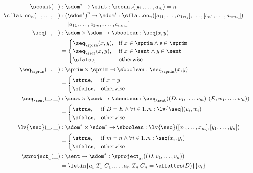 \begin{align*}
\scount(\_) &: \sdom^{*} \to \sint : \scount([a_1, \dots, a_n]) = n \\
\sflatten_n(\_, \dots, \_) &: \left(\sdom^{*}\right)^n \to \sdom^{*} : \sflatten_n([a_{11}, \dots, a_{1m_1}], \dots, [a_{n1}, \dots, a_{nm_n}]) \\
&= [a_{11}, \dots, a_{1m_1}, \dots, a_{nm_n}] \\
\seq(\_, \_) &: \sdom \times \sdom \to \sboolean : \seq(x, y) \\
&= \begin{cases}
\seq_\sprim(x, y), & \text{if } x \in \sprim \land y \in \sprim \\
\seq_\sent(x, y), & \text{if } x \in \sent \land y \in \sent \\
\sfalse, & \text{otherwise}
\end{cases} \\
\seq_\sprim(\_, \_) &: \sprim \times \sprim \to \sboolean : \seq_\sprim(x, y) \\
&= \begin{cases}
\strue, & \text{if } x = y \\
\sfalse, & \text{otherwise}
\end{cases} \\
\seq_\sent(\_, \_) &: \sent \times \sent \to \sboolean : \seq_\sent((D, v_1, \dots, v_m), (E, w_1, \dots, w_n)) \\
&= \begin{cases}
\strue, & \text{if } D = E \land \forall i \in 1..n: \lv{\seq}(v_{i}, w_{i}) \\
\sfalse, & \text{otherwise}
\end{cases} \\
\lv{\seq}(\_, \_) &: \sdom^{*} \times \sdom^{*} \to \sboolean : \lv{\seq}([x_1, \dots, x_m], [y_1, \dots, y_n]) \\
&= \begin{cases}
\strue, & \text{if } m = n \land \forall i\in 1..n: \seq(x_i, y_i) \\
\sfalse, & \text{otherwise}
\end{cases} \\
\sproject_a(\_) &: \sent \to \sdom^{*} : \sproject_{a_i}((D, v_1, \dots, v_n)) \\
&= \letin{a_1\ T_1\ C_1, \dots, a_n\ T_n\ C_n = \allattrs(D)}{v_i}
\end{align*}

